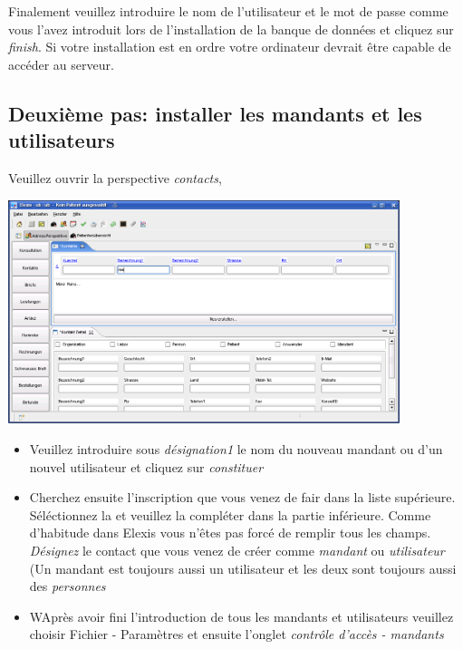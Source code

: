 Finalement veuillez introduire le nom de l'utilisateur et le mot de passe comme vous l'avez introduit lors de l'installation de la banque de données et cliquez sur \textit{finish}.
Si votre installation est en ordre votre ordinateur devrait être capable de accéder au serveur.

\subsection{Deuxième pas: installer les mandants et les utilisateurs}
Veuillez ouvrir la perspective \textit{contacts},

\includegraphics[width=4.5in]{images/grundkonfkonta.png}
\begin{itemize}
 \item Veuillez introduire sous \textit{désignation1} le nom du nouveau mandant ou d'un nouvel utilisateur  et cliquez sur \textit{constituer}
 \item Cherchez ensuite l'inscription que vous venez de fair dans la liste supérieure. Séléctionnez la et veuillez la compléter dans la partie inférieure. Comme d'habitude dans Elexis vous n'êtes pas forcé de remplir tous les champs.
 \textit{Désignez} le contact que vous venez de créer comme \textit{mandant} ou \textit{utilisateur} (Un mandant est toujours aussi un utilisateur et les deux sont toujours aussi des  \textit{personnes}
 \item WAprès avoir fini l'introduction de tous les mandants et utilisateurs veuillez choisir Fichier - Paramètres et ensuite l'onglet \textit{contrôle d'accès - mandants}
\end{itemize}

